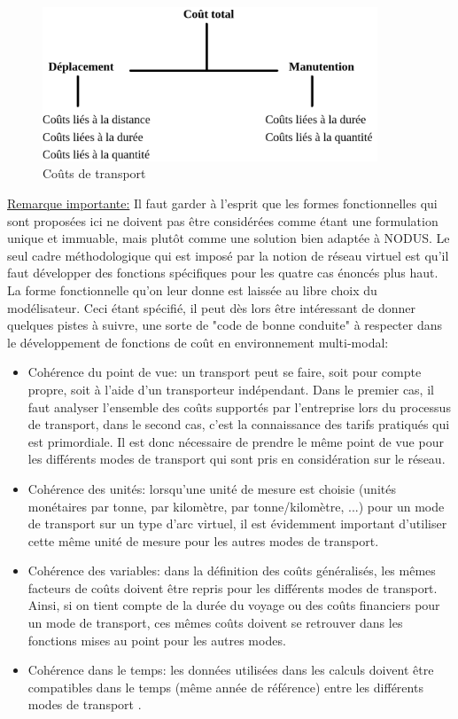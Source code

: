 \begin{figure}[htbp]
\centerline{\includegraphics[width=10cm]{f4_1.png}}
\caption{\label{f4_1} Co\^uts de transport}
\end{figure}



\underline{Remarque importante:} Il faut garder à l'esprit que les formes
fonctionnelles qui sont proposées ici ne doivent pas être
considérées comme étant une formulation unique et immuable, mais
plutôt comme une solution bien adaptée à NODUS. Le seul cadre
méthodologique qui est imposé par la notion de réseau virtuel est
qu'il faut développer des fonctions spécifiques pour les quatre cas
énoncés plus haut. La forme fonctionnelle qu'on leur donne est
laissée au libre choix du modélisateur. Ceci étant spécifié, il
peut dès lors être intéressant de donner quelques pistes à suivre,
une sorte de "code de bonne conduite" à respecter dans le
développement de fonctions de coût en environnement multi-modal:

\begin{itemize}
\item Cohérence du point de vue: un transport peut se faire, soit pour
compte propre, soit à l'aide d'un transporteur indépendant. Dans le premier cas,
il faut analyser l'ensemble des coûts supportés par l'entreprise lors du
processus de transport, dans le second cas, c'est la connaissance des tarifs
pratiqués qui est primordiale. Il est donc nécessaire de prendre le même point
de vue pour les différents modes de transport qui sont pris en considération sur
le réseau.

\item Cohérence des unités: lorsqu'une unité de mesure est
choisie (unités moné\-taires par tonne, par kilomètre, par tonne/kilomètre, ...)
pour un mode de trans\-port sur un type d'arc virtuel, il est
évidemment important d'utiliser cette même unité de mesure pour les
autres modes de transport.

\item Cohérence des variables: dans la définition des coûts généralisés,
les mêmes facteurs de coûts doivent être repris pour les différents
modes de transport. Ainsi, si on tient compte de la durée du voyage
ou des coûts financiers pour un mode de transport, ces mêmes coûts
doivent se retrouver dans les fonctions mises au point pour les
autres modes.

\item Cohérence dans le temps: les données utilisées dans les calculs
doivent être compatibles dans le temps (même année de référence)
entre les différents modes de transport .
\end{itemize}

